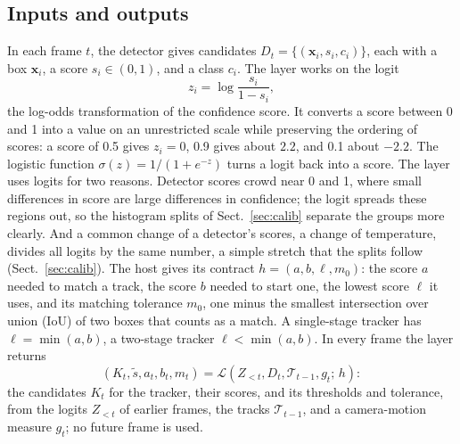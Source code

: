 \subsection{Inputs and outputs}\label{sec:problem}
In each frame $t$, the detector gives candidates $D_t=\{(\mathbf{x}_i,s_i,c_i)\}$, each with a box
$\mathbf{x}_i$, a score $s_i\in(0,1)$, and a class $c_i$. The layer works on the logit
\begin{equation}
z_i=\log\frac{s_i}{1-s_i},
\label{eq:logit}
\end{equation}
the log-odds transformation of the confidence score. It converts a score between 0 and 1 into a
value on an unrestricted scale while preserving the ordering of scores: a score of 0.5 gives
$z_i=0$, 0.9 gives about $2.2$, and 0.1 about $-2.2$. The logistic function
$\sigma(z)=1/(1+e^{-z})$ turns a logit back into a score. The layer uses logits for two reasons.
Detector scores crowd near 0 and 1, where small differences in score are large differences in
confidence; the logit spreads these regions out, so the histogram splits of
Sect.~\ref{sec:calib} separate the groups more clearly. And a common change of a detector's
scores, a change of temperature, divides all logits by the same number, a simple stretch that the
splits follow (Sect.~\ref{sec:calib}). The host gives its contract $h=(a,b,\ell,m_0)$: the score $a$ needed to match a
track, the score $b$ needed to start one, the lowest score $\ell$ it uses, and its matching
tolerance $m_0$, one minus the smallest intersection over union (IoU) of two boxes that counts as a
match. A single-stage tracker has $\ell=\min(a,b)$, a two-stage tracker $\ell<\min(a,b)$. In
every frame the layer returns
\begin{equation}
\left(K_t,\tilde{s},a_t,b_t,m_t\right)=
\mathcal{L}\left(Z_{<t},D_t,\mathcal{T}_{t-1},g_t;\,h\right):
\label{eq:layer}
\end{equation}
the candidates $K_t$ for the tracker, their scores, and its thresholds and tolerance, from the
logits $Z_{<t}$ of earlier frames, the tracks $\mathcal{T}_{t-1}$, and a camera-motion measure
$g_t$; no future frame is used.

